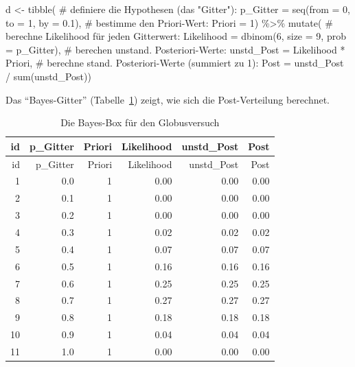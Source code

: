\documentclass[
  a4paper,
  DIV=11]{scrreprt}
\newenvironment{Shaded}{\begin{snugshade}}{\end{snugshade}}
\newcommand{\AttributeTok}[1]{\textcolor[rgb]{0.40,0.45,0.13}{#1}}
\newcommand{\CommentTok}[1]{\textcolor[rgb]{0.37,0.37,0.37}{#1}}
\newcommand{\DecValTok}[1]{\textcolor[rgb]{0.68,0.00,0.00}{#1}}
\newcommand{\FloatTok}[1]{\textcolor[rgb]{0.68,0.00,0.00}{#1}}
\newcommand{\FunctionTok}[1]{\textcolor[rgb]{0.28,0.35,0.67}{#1}}
\newcommand{\NormalTok}[1]{\textcolor[rgb]{0.00,0.23,0.31}{#1}}
\newcommand{\OtherTok}[1]{\textcolor[rgb]{0.00,0.23,0.31}{#1}}
\newcommand{\SpecialCharTok}[1]{\textcolor[rgb]{0.37,0.37,0.37}{#1}}
\theoremstyle{definition}
\theoremstyle{remark}
\begin{document}
\begin{Shaded}
\begin{Highlighting}[]
\NormalTok{d }\OtherTok{\textless{}{-}}
  \FunctionTok{tibble}\NormalTok{(}
    \CommentTok{\# definiere die Hypothesen (das "Gitter"): }
    \AttributeTok{p\_Gitter =} \FunctionTok{seq}\NormalTok{(}\AttributeTok{from =} \DecValTok{0}\NormalTok{, }\AttributeTok{to =} \DecValTok{1}\NormalTok{, }\AttributeTok{by =} \FloatTok{0.1}\NormalTok{),}
    \CommentTok{\# bestimme den Priori{-}Wert:       }
    \AttributeTok{Priori  =} \DecValTok{1}\NormalTok{) }\SpecialCharTok{\%\textgreater{}\%}  
    \FunctionTok{mutate}\NormalTok{(}
      \CommentTok{\# berechne Likelihood für jeden Gitterwert:}
      \AttributeTok{Likelihood =} \FunctionTok{dbinom}\NormalTok{(}\DecValTok{6}\NormalTok{, }\AttributeTok{size =} \DecValTok{9}\NormalTok{, }\AttributeTok{prob =}\NormalTok{ p\_Gitter),}
      \CommentTok{\# berechen unstand. Posteriori{-}Werte:}
      \AttributeTok{unstd\_Post =}\NormalTok{ Likelihood }\SpecialCharTok{*}\NormalTok{ Priori,}
      \CommentTok{\# berechne stand. Posteriori{-}Werte (summiert zu 1):}
      \AttributeTok{Post =}\NormalTok{ unstd\_Post }\SpecialCharTok{/} \FunctionTok{sum}\NormalTok{(unstd\_Post))  }
\end{Highlighting}
\end{Shaded}

Das ``Bayes-Gitter'' (Tabelle~\ref{tbl-globus}) zeigt, wie sich die
Post-Verteilung berechnet.

\hypertarget{tbl-globus}{}
\begin{longtable}[]{@{}rrrrrr@{}}
\caption{\label{tbl-globus}Die Bayes-Box für den
Globusversuch}\tabularnewline
\toprule()
id & p\_Gitter & Priori & Likelihood & unstd\_Post & Post \\
\midrule()
\endfirsthead
\toprule()
id & p\_Gitter & Priori & Likelihood & unstd\_Post & Post \\
\midrule()
\endhead
1 & 0.0 & 1 & 0.00 & 0.00 & 0.00 \\
2 & 0.1 & 1 & 0.00 & 0.00 & 0.00 \\
3 & 0.2 & 1 & 0.00 & 0.00 & 0.00 \\
4 & 0.3 & 1 & 0.02 & 0.02 & 0.02 \\
5 & 0.4 & 1 & 0.07 & 0.07 & 0.07 \\
6 & 0.5 & 1 & 0.16 & 0.16 & 0.16 \\
7 & 0.6 & 1 & 0.25 & 0.25 & 0.25 \\
8 & 0.7 & 1 & 0.27 & 0.27 & 0.27 \\
9 & 0.8 & 1 & 0.18 & 0.18 & 0.18 \\
10 & 0.9 & 1 & 0.04 & 0.04 & 0.04 \\
11 & 1.0 & 1 & 0.00 & 0.00 & 0.00 \\
\bottomrule()
\end{longtable}
\end{document}
